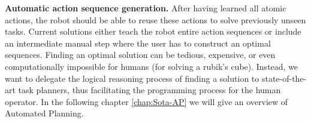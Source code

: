 \textbf{Automatic action sequence generation.}
After having learned all atomic actions, the robot should be able to reuse these actions  to solve previously unseen tasks.
Current solutions either teach the robot entire action sequences or include an intermediate manual step where the user has to construct an optimal sequences.
Finding an optimal solution can be tedious, expensive, or even computationally impossible for humans (\eg for solving a rubik's cube).
Instead, we want to delegate the logical reasoning process of finding a solution to state-of-the-art task planners, thus facilitating the programming process for the human operator.
In the following chapter \ref{chap:Sota-AP} we will give an overview of Automated Planning.